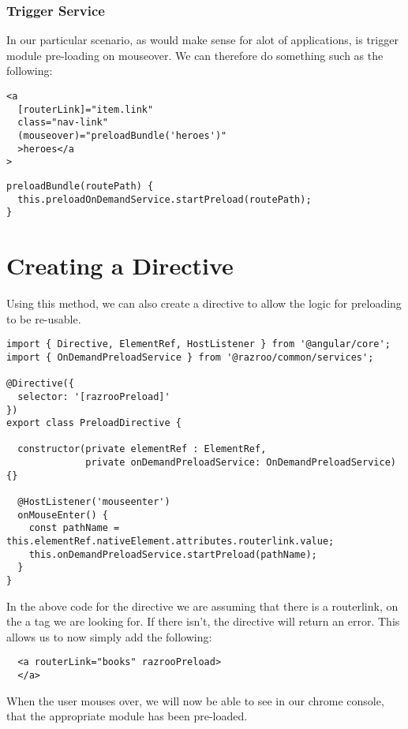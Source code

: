 \subsubsection{Trigger Service}
In our particular scenario, as would make sense for alot of applications, is trigger 
module pre-loading on mouseover. We can therefore do something such as the following: 
\begin{lstlisting}
<a
  [routerLink]="item.link"
  class="nav-link"
  (mouseover)="preloadBundle('heroes')"
  >heroes</a
>  
\end{lstlisting}

\begin{lstlisting}
preloadBundle(routePath) {
  this.preloadOnDemandService.startPreload(routePath);
}
\end{lstlisting}

\section{Creating a Directive}
Using this method, we can also create a directive to allow the logic for 
preloading to be re-usable. 

\begin{lstlisting}[caption=preload.directive.ts]
import { Directive, ElementRef, HostListener } from '@angular/core';
import { OnDemandPreloadService } from '@razroo/common/services';

@Directive({
  selector: '[razrooPreload]'
})
export class PreloadDirective {

  constructor(private elementRef : ElementRef,
              private onDemandPreloadService: OnDemandPreloadService) {}

  @HostListener('mouseenter')
  onMouseEnter() {
    const pathName = this.elementRef.nativeElement.attributes.routerlink.value;
    this.onDemandPreloadService.startPreload(pathName);
  }
}
\end{lstlisting}

In the above code for the directive we are assuming that there 
is a routerlink, on the a tag we are looking for. If there isn't, the directive 
will return an error. This allows us to now simply add the following: 
\begin{lstlisting}
  <a routerLink="books" razrooPreload>
  </a> 
\end{lstlisting}

When the user mouses over, we will now be able to see in our chrome console,
that the appropriate module has been pre-loaded. 



